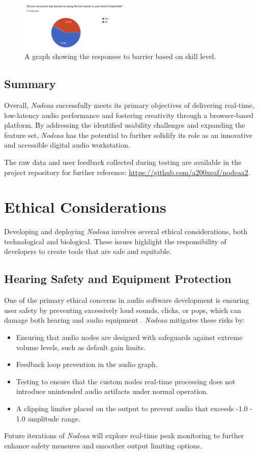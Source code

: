 \documentclass[10pt,twocolumn]{article}
\begin{document}
\begin{figure}[ht]
    \centering
    \includegraphics[width=0.46\textwidth]{images/surveybarriers.png}
    \caption{A graph showing the responses to barrier based on skill level.}
    \label{fig:surveybarriers}
\end{figure}

\subsection{Summary}
Overall, \textit{Nodeaa} successfully meets its primary objectives of delivering real-time, low-latency audio performance and fostering creativity through a browser-based platform. By addressing the identified usability challenges and expanding the feature set, \textit{Nodeaa} has the potential to further solidify its role as an innovative and accessible digital audio workstation.

The raw data and user feedback collected during testing are available in the project repository for further reference: \url{https://github.com/a200xeaf/nodeaa2}.

\section{Ethical Considerations}

Developing and deploying \textit{Nodeaa} involves several ethical considerations, both technological and biological. These issues highlight the responsibility of developers to create tools that are safe and equitable.

\subsection{Hearing Safety and Equipment Protection}
One of the primary ethical concerns in audio software development is ensuring user safety by preventing excessively loud sounds, clicks, or pops, which can damage both hearing and audio equipment \cite{zhao2010music} \cite{pienkowski2021loud}. \textit{Nodeaa} mitigates these risks by:
\begin{itemize}
    \item Ensuring that audio nodes are designed with safeguards against extreme volume levels, such as default gain limits.
    \item Feedback loop prevention in the audio graph.
    \item Testing to ensure that the custom nodes real-time processing does not introduce unintended audio artifacts under normal operation.
    \item A clipping limiter placed on the output to prevent audio that exceeds -1.0 - 1.0 amplitude range.
\end{itemize}
Future iterations of \textit{Nodeaa} will explore real-time peak monitoring to further enhance safety measures and smoother output limiting options.
\end{document}
